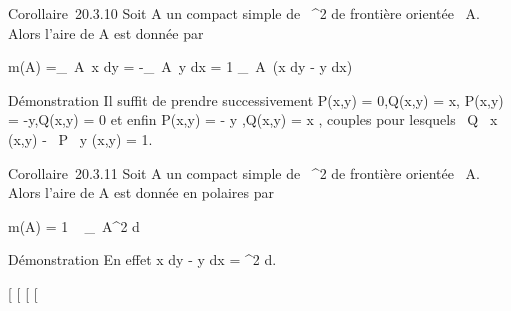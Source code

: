 \documentclass[]{article}
\begin{document}
Corollaire~20.3.10 Soit A un compact simple de ~^2 de
frontière orientée \partial~A. Alors l'aire de A est donnée par

m(A) =\int  \_\partial~A~x dy =
-\int  \_\partial~A~y dx = 1
 \int  \_\partial~A~(x dy
- y dx)

Démonstration Il suffit de prendre successivement P(x,y) = 0,Q(x,y) = x,
P(x,y) = -y,Q(x,y) = 0 et enfin P(x,y) = - y 
,Q(x,y) = x  , couples pour lesquels  \partial~Q
\over \partial~x (x,y) - \partial~P \over \partial~y (x,y) =
1.

Corollaire~20.3.11 Soit A un compact simple de ~^2 de
frontière orientée \partial~A. Alors l'aire de A est donnée en polaires par

m(A) = 1  \int ~
\_\partial~A\rho^2 d\theta

Démonstration En effet x dy - y dx = \rho^2 d\theta.

{[}
{[}
{[}
{[}
\end{document}

